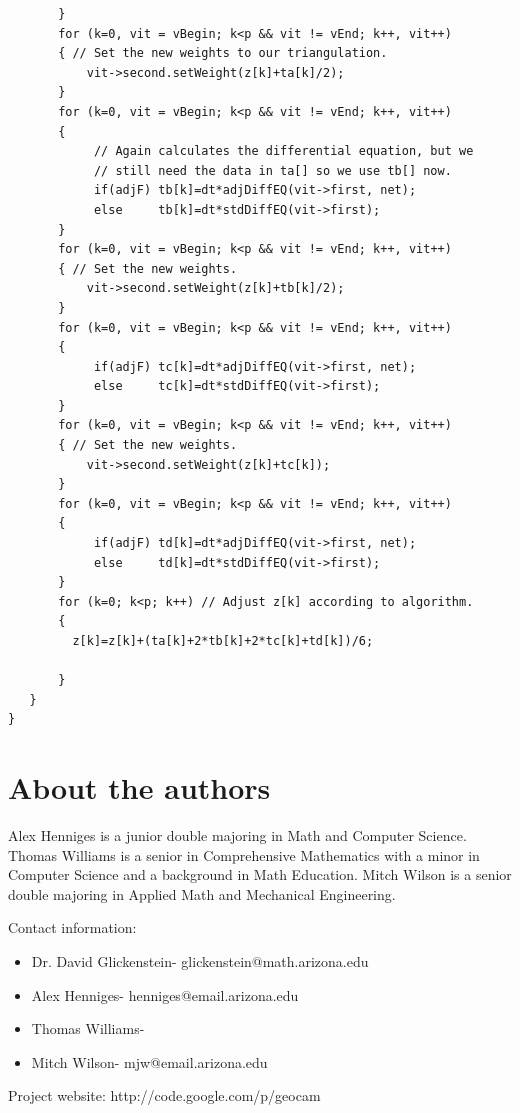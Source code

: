 \documentclass[12pt]{article}
\begin{document}
\begin{verbatim}
       }
       for (k=0, vit = vBegin; k<p && vit != vEnd; k++, vit++)  
       { // Set the new weights to our triangulation.
           vit->second.setWeight(z[k]+ta[k]/2);
       }
       for (k=0, vit = vBegin; k<p && vit != vEnd; k++, vit++)  
       {
            // Again calculates the differential equation, but we
            // still need the data in ta[] so we use tb[] now.
            if(adjF) tb[k]=dt*adjDiffEQ(vit->first, net);
            else     tb[k]=dt*stdDiffEQ(vit->first);
       }
       for (k=0, vit = vBegin; k<p && vit != vEnd; k++, vit++)  
       { // Set the new weights.
           vit->second.setWeight(z[k]+tb[k]/2);
       }
       for (k=0, vit = vBegin; k<p && vit != vEnd; k++, vit++)  
       {
            if(adjF) tc[k]=dt*adjDiffEQ(vit->first, net);
            else     tc[k]=dt*stdDiffEQ(vit->first);
       }
       for (k=0, vit = vBegin; k<p && vit != vEnd; k++, vit++)  
       { // Set the new weights.
           vit->second.setWeight(z[k]+tc[k]);
       }
       for (k=0, vit = vBegin; k<p && vit != vEnd; k++, vit++)  
       {
            if(adjF) td[k]=dt*adjDiffEQ(vit->first, net);
            else     td[k]=dt*stdDiffEQ(vit->first);
       }
       for (k=0; k<p; k++) // Adjust z[k] according to algorithm.
       {
         z[k]=z[k]+(ta[k]+2*tb[k]+2*tc[k]+td[k])/6;
         
       }
   }
}
\end{verbatim}

\section*{About the authors}

Alex Henniges is a junior double majoring in Math and Computer Science. Thomas Williams is a senior in Comprehensive Mathematics with a minor in Computer Science and a background in Math Education. Mitch Wilson is a senior double majoring in Applied Math and Mechanical Engineering.\newline

\noindent Contact information:
\begin{itemize}
\item Dr. David Glickenstein- glickenstein@math.arizona.edu
\item Alex Henniges- henniges@email.arizona.edu
\item Thomas Williams-
\item Mitch Wilson- mjw@email.arizona.edu
\end{itemize}
\noindent Project website: http://code.google.com/p/geocam
\end{document}
